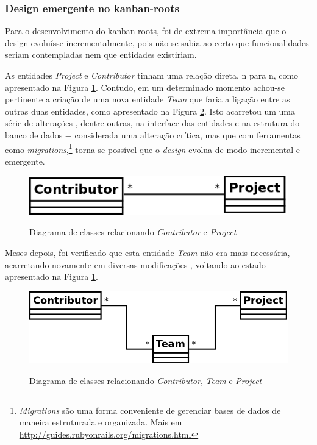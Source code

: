 \subsubsection{Design emergente no kanban-roots} %
\label{ssub:design_emergente_no_kanban_roots}

Para o desenvolvimento do kanban-roots, foi de extrema importância que o design evoluísse incrementalmente, pois não se sabia ao certo que
funcionalidades seriam contempladas nem que entidades existiriam.

As entidades \textit{Project} e \textit{Contributor} tinham uma relação direta, n para n, como apresentado na Figura \ref{img:contributor_projetc}. Contudo, em um determinado momento achou-se pertinente a criação de uma nova entidade \textit{Team} que faria a ligação entre as outras duas entidades, como apresentado na Figura \ref{img:contributor_team_projetc}. Isto acarretou um uma série de alterações \cite{CommitAddTeam}, dentre outras, na interface das entidades e na estrutura do banco de dados $-$ considerada uma alteração crítica, mas que com ferramentas como \textit{migrations},\footnote{\textit{Migrations} são uma forma conveniente de gerenciar bases de dados de maneira estruturada e organizada. Mais em \url{http://guides.rubyonrails.org/migrations.html}} torna-se possível que o \textit{design} evolua de modo incremental e emergente.

\begin{figure}[h]
  \center
  \caption{Diagrama de classes relacionando \textit{Contributor} e \textit{Project}}
  \includegraphics[scale=0.28]{images/contributor_projetc}
  \label{img:contributor_projetc}
\end{figure}

Meses depois, foi verificado que esta entidade \textit{Team} não era mais necessária, acarretando novamente em diversas modificações \cite{CommitRemoveTeam}, voltando ao estado apresentado na Figura \ref{img:contributor_projetc}.

\begin{figure}[h]
  \center
  \caption{Diagrama de classes relacionando \textit{Contributor}, \textit{Team} e \textit{Project}}
  \includegraphics[scale=0.25]{images/contributor_team_projetc}
  \label{img:contributor_team_projetc}
\end{figure}

